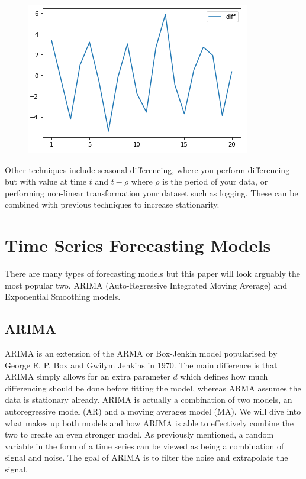 \documentclass{article}
\begin{document}
\begin{flushleft}
\begin{figure}[H]
    \end{figure}
    \begin{figure}[H]
      \centering
      \includegraphics[scale=0.8]{regression_plot.png}
    \end{figure}
    Other techniques include seasonal differencing, where you perform differencing but with value at time $t$ and $t-\rho$ where $\rho$ is the period of your data, or performing non-linear transformation your dataset such as logging. These can be combined with previous techniques to increase stationarity.
  \end{flushleft}
  \newpage
  \section{Time Series Forecasting Models}
  There are many types of forecasting models but this paper will look arguably the most popular two. ARIMA (Auto-Regressive Integrated Moving Average) and Exponential Smoothing models. 
  \subsection{ARIMA}
  ARIMA is an extension of the ARMA or Box-Jenkin model popularised by George E. P. Box and Gwilym Jenkins in 1970. The main difference is that ARIMA simply allows for an extra parameter $d$ which defines how much differencing should be done before fitting the model, whereas ARMA assumes the data is stationary already. 
  ARIMA is actually a combination of two models, an autoregressive model (AR) and a moving averages model (MA). We will dive into what makes up both models and how ARIMA is able to effectively combine the two to create an even stronger model.
  As previously mentioned, a random variable in the form of a time series can be viewed as being a combination of signal and noise. The goal of ARIMA is to filter the noise and extrapolate the signal.
\end{document}
